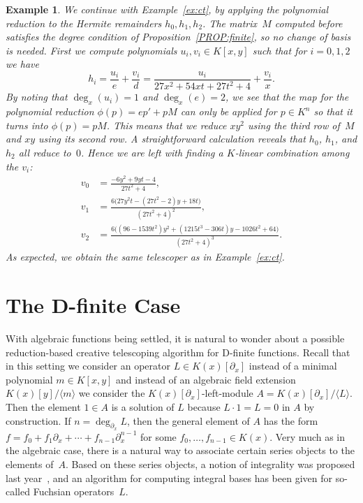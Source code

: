 \documentclass{sig-alternate-05-2015}
\newtheorem{example}[theorem]{Example}
\begin{document}
\begin{example}
We continue with Example~\ref{ex:ct}, by applying the polynomial reduction
to the Hermite remainders $h_0,h_1,h_2$. The matrix~$M$ computed before
satisfies the degree condition of Proposition~\ref{PROP:finite}, so no
change of basis is needed. First we compute polynomials
$u_i,v_i\in K[x,y]$ such that for $i=0,1,2$ we have
\[
  h_i = \frac{u_i}{e} + \frac{v_i}{d} = \frac{u_i}{27x^2+54xt+27t^2+4} + \frac{v_i}{x}.
\]
By noting that $\deg_x(u_i)=1$ and $\deg_x(e)=2$, we see that the
map for the polynomial reduction $\phi(p) = ep' + pM$ can only be
applied for $p\in K^n$ so that it turns into $\phi(p) = pM$.
This means that we reduce $xy^2$ using the third row of~$M$ and
$xy$ using its second row. A straightforward calculation reveals
that $h_0$, $h_1$, and $h_2$ all reduce to~$0$. Hence we are left
with finding a $K$-linear combination among the $v_i$:
\begin{align*}
 v_0 &= \frac{-6y^2+9yt-4}{27t^2+4},\\
 v_1 &= \frac{6\bigl(27y^2t-(27t^2-2)y+18t\bigr)}{(27t^2+4)^2},\\
 v_2 &= \frac{6\bigl((96-1539t^2)y^2+(1215t^3-306t)y-1026t^2+64\bigr)}{(27t^2+4)^3}.
\end{align*}
As expected, we obtain the same telescoper as in Example~\ref{ex:ct}.
\end{example}


\section{The D-finite Case}

With algebraic functions being settled, it is natural to wonder about a possible
reduction-based creative telescoping algorithm for D-finite functions. Recall
that in this setting we consider an operator $L\in K(x)[\partial_x]$ instead of a minimal
polynomial $m\in K[x,y]$ and instead of an algebraic field extension
$K(x)[y]/\langle m\rangle$ we consider the $K(x)[\partial_x]$-left-module
$A=K(x)[\partial_x]/\langle L\rangle$. Then the element $1\in A$ is a solution of $L$
because $L\cdot 1=L=0$ in $A$ by construction. If $n=\deg_{\partial_x}L$, then
the general element of $A$ has the form
$f=f_0+f_1\partial_x+\cdots+f_{n-1}\partial_x^{n-1}$ for some
$f_0,\dots,f_{n-1}\in K(x)$. Very much as in the algebraic case, there is a natural way
to associate certain series objects to the elements of~$A$. Based on these
series objects, a notion of integrality was proposed last year~\cite{kauers15b}, and an
algorithm for computing integral bases has been given for so-called Fuchsian
operators~$L$.
\end{document}
